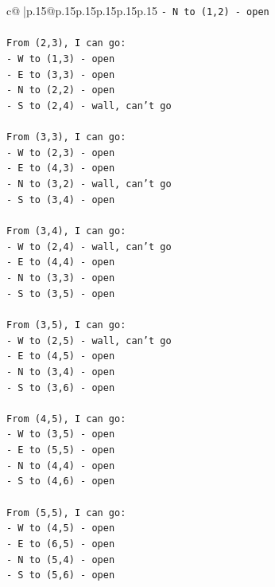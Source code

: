 \documentclass{article}
\begin{document}
{\begin{supertabular}{c@{$\;$}|p{.15\linewidth}@{}p{.15\linewidth}p{.15\linewidth}p{.15\linewidth}p{.15\linewidth}p{.15\linewidth}}
{{{\texttt{{-} N to (1,2) {-} open} \\
\\ 
\texttt{From (2,3), I can go:} \\
\texttt{{-} W to (1,3) {-} open} \\
\texttt{{-} E to (3,3) {-} open} \\
\texttt{{-} N to (2,2) {-} open} \\
\texttt{{-} S to (2,4) {-} wall, can't go} \\
\\ 
\texttt{From (3,3), I can go:} \\
\texttt{{-} W to (2,3) {-} open} \\
\texttt{{-} E to (4,3) {-} open} \\
\texttt{{-} N to (3,2) {-} wall, can't go} \\
\texttt{{-} S to (3,4) {-} open} \\
\\ 
\texttt{From (3,4), I can go:} \\
\texttt{{-} W to (2,4) {-} wall, can't go} \\
\texttt{{-} E to (4,4) {-} open} \\
\texttt{{-} N to (3,3) {-} open} \\
\texttt{{-} S to (3,5) {-} open} \\
\\ 
\texttt{From (3,5), I can go:} \\
\texttt{{-} W to (2,5) {-} wall, can't go} \\
\texttt{{-} E to (4,5) {-} open} \\
\texttt{{-} N to (3,4) {-} open} \\
\texttt{{-} S to (3,6) {-} open} \\
\\ 
\texttt{From (4,5), I can go:} \\
\texttt{{-} W to (3,5) {-} open} \\
\texttt{{-} E to (5,5) {-} open} \\
\texttt{{-} N to (4,4) {-} open} \\
\texttt{{-} S to (4,6) {-} open} \\
\\ 
\texttt{From (5,5), I can go:} \\
\texttt{{-} W to (4,5) {-} open} \\
\texttt{{-} E to (6,5) {-} open} \\
\texttt{{-} N to (5,4) {-} open} \\
\texttt{{-} S to (5,6) {-} open} \\
}}}
\end{supertabular}}
\end{document}
